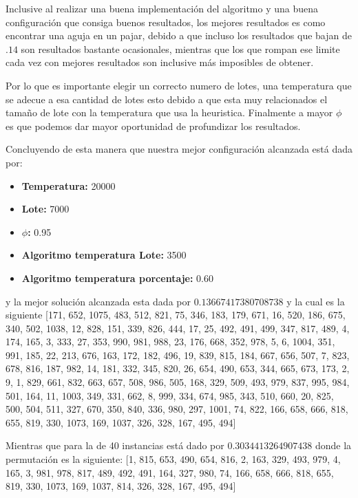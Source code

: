 \begin{multicols}{2}
Inclusive al realizar una buena implementación del algoritmo y una buena configuración que consiga buenos resultados, los mejores resultados es como encontrar una aguja en un pajar, debido a que incluso los resultados que bajan de $.14$ son resultados bastante ocasionales, mientras que los que rompan ese limite cada vez con mejores resultados son inclusive más imposibles de obtener.

Por lo que es importante elegir un correcto numero de lotes, una temperatura que se adecue a esa cantidad de lotes esto debido a que esta muy relacionados el tamaño de lote con la temperatura que usa la heuristica. Finalmente a mayor $\phi$ es que podemos dar mayor oportunidad de profundizar los resultados.

Concluyendo de esta manera que nuestra mejor configuración alcanzada está dada por:

\begin{itemize}
\item \textbf{Temperatura:} 20000
\item \textbf{Lote: } 7000
\item \textbf{$\phi$: } 0.95
\item \textbf{Algoritmo temperatura Lote: } 3500
\item \textbf{Algoritmo temperatura porcentaje: } 0.60
\end{itemize}

y la mejor solución alcanzada esta dada por $0.13667417380708738$ y la cual es la siguiente [171, 652, 1075, 483, 512, 821, 75, 346, 183, 179, 671, 16, 520, 186, 675, 340, 502, 1038, 12, 828, 151, 339, 826, 444, 17, 25, 492, 491, 499, 347, 817, 489, 4, 174, 165, 3, 333, 27, 353, 990, 981, 988, 23, 176, 668, 352, 978, 5, 6, 1004, 351, 991, 185, 22, 213, 676, 163, 172, 182, 496, 19, 839, 815, 184, 667, 656, 507, 7, 823, 678, 816, 187, 982, 14, 181, 332, 345, 820, 26, 654, 490, 653, 344, 665, 673, 173, 2, 9, 1, 829, 661, 832, 663, 657, 508, 986, 505, 168, 329, 509, 493, 979, 837, 995, 984, 501, 164, 11, 1003, 349, 331, 662, 8, 999, 334, 674, 985, 343, 510, 660, 20, 825, 500, 504, 511, 327, 670, 350, 840, 336, 980, 297, 1001, 74, 822, 166, 658, 666, 818, 655, 819, 330, 1073, 169, 1037, 326, 328, 167, 495, 494]

Mientras que para la de 40 instancias está dado por $0.3034413264907438$ donde la permutación es la siguiente: [1, 815, 653, 490, 654, 816, 2, 163, 329, 493, 979, 4, 165, 3, 981, 978, 817, 489, 492, 491, 164, 327, 980, 74, 166, 658, 666, 818, 655, 819, 330, 1073, 169, 1037, 814, 326, 328, 167, 495, 494] 



\end{multicols}



